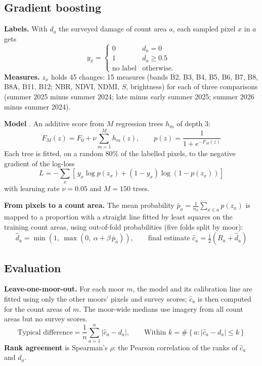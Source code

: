 \documentclass[11pt,a4paper]{article}
\begin{document}
\subsection{Gradient boosting}
\textbf{Labels.} With $d_a$ the surveyed damage of count area $a$, each sampled pixel $x$ in $a$ gets
\[
y_x = \begin{cases}0 & d_a = 0\\ 1 & d_a \ge 0.5\\ \text{no label} & \text{otherwise.}\end{cases}
\]
\textbf{Measures.} $z_x$ holds 45 changes: 15 measures (bands B2, B3, B4, B5, B6, B7, B8, B8A, B11, B12; NBR, NDVI, NDMI, $S$, brightness) for each of three comparisons (summer 2025 minus summer 2024; late minus early summer 2025; summer 2026 minus summer 2024).

\textbf{Model} \citep{friedman2001,pedregosa2011}. An additive score from $M$ regression trees $h_m$ of depth 3:
\[
F_M(z) = F_0 + \nu\sum_{m=1}^{M} h_m(z), \qquad p(z) = \frac{1}{1+e^{-F_M(z)}}
\]
Each tree is fitted, on a random 80\% of the labelled pixels, to the negative gradient of the log-loss
\[
L = -\sum_x \left[\,y_x \log p(z_x) + (1-y_x)\log\!\left(1-p(z_x)\right)\right]
\]
with learning rate $\nu = 0.05$ and $M = 150$ trees.

\textbf{From pixels to a count area.} The mean probability $\bar p_a = \frac{1}{n_a}\sum_{x\in a} p(z_x)$ is mapped to a proportion with a straight line fitted by least squares on the training count areas, using out-of-fold probabilities (five folds split by moor):
\[
\hat d_a = \min\!\left(1,\ \max\!\left(0,\ \alpha + \beta\,\bar p_a\right)\right), \qquad \text{final estimate } \hat c_a = \tfrac{1}{2}\left(R_a + \hat d_a\right)
\]

\subsection{Evaluation}
\textbf{Leave-one-moor-out.} For each moor $m$, the model and its calibration line are fitted using only the other moors' pixels and survey scores; $\hat c_a$ is then computed for the count areas of $m$. The moor-wide medians use imagery from all count areas but no survey scores.
\[
\text{Typical difference} = \frac{1}{n}\sum_{a=1}^{n}\left|\hat c_a - d_a\right|, \qquad \text{Within } k = \#\left\{a : \left|\hat c_a - d_a\right| \le k\right\}
\]
\textbf{Rank agreement} is Spearman's $\rho$: the Pearson correlation of the ranks of $\hat c_a$ and $d_a$.
\end{document}
